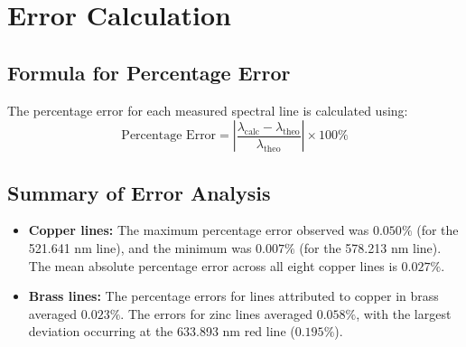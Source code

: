 \documentclass[12pt, a4paper]{article}
\begin{document}
\section{Error Calculation}

\subsection{Formula for Percentage Error}
The percentage error for each measured spectral line is calculated using:
\begin{equation}
    \text{Percentage Error} = \left| \frac{\lambda_{\text{calc}} - \lambda_{\text{theo}}}{\lambda_{\text{theo}}} \right| \times 100\%
\end{equation}

\subsection{Summary of Error Analysis}
\begin{itemize}
    \item \textbf{Copper lines:} The maximum percentage error observed was $0.050\%$ (for the 521.641 nm line), and the minimum was $0.007\%$ (for the 578.213 nm line). The mean absolute percentage error across all eight copper lines is $0.027\%$.
    \item \textbf{Brass lines:} The percentage errors for lines attributed to copper in brass averaged $0.023\%$. The errors for zinc lines averaged $0.058\%$, with the largest deviation occurring at the 633.893 nm red line ($0.195\%$).
\end{itemize}
\end{document}
